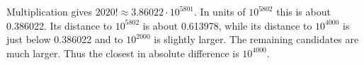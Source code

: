Multiplication gives $2020!\approx3.86022\cdot10^{5801}$. In units of $10^{5802}$ this is about 0.386022. Its distance to $10^{5802}$ is about 0.613978, while its distance to $10^{4000}$ is just below 0.386022 and to $10^{2000}$ is slightly larger. The remaining candidates are much larger. Thus the closest in absolute difference is $\boxed{10^{4000}}$.
